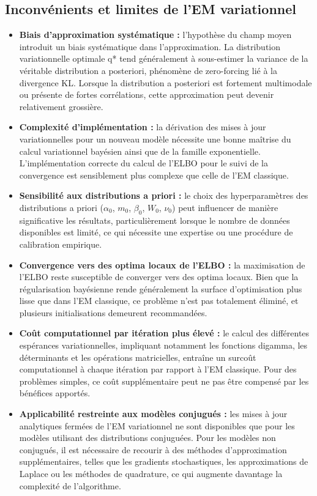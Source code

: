 \subsection{Inconvénients et limites de l'EM variationnel}
\begin{itemize}
\item \textbf{Biais d'approximation systématique : }l'hypothèse du champ moyen introduit un biais systématique dans l'approximation. La distribution variationnelle optimale q* tend généralement à sous-estimer la variance de la véritable distribution a posteriori, phénomène de zero-forcing lié à la divergence KL. Lorsque la distribution a posteriori est fortement multimodale ou présente de fortes corrélations, cette approximation peut devenir relativement grossière.
\item \textbf{Complexité d'implémentation : }la dérivation des mises à jour variationnelles pour un nouveau modèle nécessite une bonne maîtrise du calcul variationnel bayésien ainsi que de la famille exponentielle. L'implémentation correcte du calcul de l'ELBO pour le suivi de la convergence est sensiblement plus complexe que celle de l'EM classique.
\item \textbf{Sensibilité aux distributions a priori : }le choix des hyperparamètres des distributions a priori ($\alpha _{0}$, $m_{0}$, $\beta _{0}$, $W_{0}$, $\nu _{0}$) peut influencer de manière significative les résultats, particulièrement lorsque le nombre de données disponibles est limité, ce qui nécessite une expertise ou une procédure de calibration empirique.
\item \textbf{Convergence vers des optima locaux de l'ELBO : }la maximisation de l'ELBO reste susceptible de converger vers des optima locaux. Bien que la régularisation bayésienne rende généralement la surface d'optimisation plus lisse que dans l'EM classique, ce problème n'est pas totalement éliminé, et plusieurs initialisations demeurent recommandées.
\item \textbf{Coût computationnel par itération plus élevé : }le calcul des différentes espérances variationnelles, impliquant notamment les fonctions digamma, les déterminants et les opérations matricielles, entraîne un surcoût computationnel à chaque itération par rapport à l'EM classique. Pour des problèmes simples, ce coût supplémentaire peut ne pas être compensé par les bénéfices apportés.
\item \textbf{Applicabilité restreinte aux modèles conjugués : }les mises à jour analytiques fermées de l'EM variationnel ne sont disponibles que pour les modèles utilisant des distributions conjuguées. Pour les modèles non conjugués, il est nécessaire de recourir à des méthodes d'approximation supplémentaires, telles que les gradients stochastiques, les approximations de Laplace ou les méthodes de quadrature, ce qui augmente davantage la complexité de l'algorithme.
\end{itemize}
